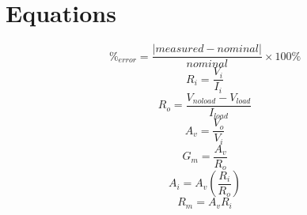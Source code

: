 \documentclass{article}
\begin{document}
\section*{Equations}

\[\%_{error} = \frac{|measured - nominal|}{nominal} \times 100\%\]
\[R_i = \frac{V_i}{I_i}\]
\[R_o = \frac{V_{noload} - V_{load}}{I_{load}}\]
\[A_v = \frac{V_o}{V_i}\]
\[G_m = \frac{A_v}{R_o}\]
\[A_i = A_v \left(\frac{R_i}{R_o}\right)\]
\[R_m = A_v R_i\]
\end{document}
